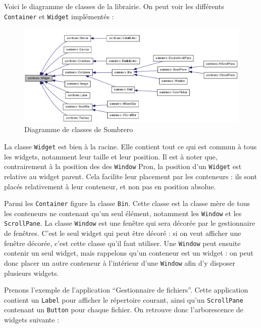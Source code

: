 Voici le diagramme de classes de la librairie. On peut voir les différents \verb|Container| et \verb|Widget| implémentés :

\begin{figure}[H]
  \centering
  \includegraphics[width=17.5cm]{images/classDiagWidget.png}
  \caption{Diagramme de classes de Sombrero}
  \label{fig:diagrame_classes_sombrero}
\end{figure}

La classe \verb|Widget| est bien à la racine.
Elle contient tout ce qui est commun à tous les widgets, notamment leur taille et leur position.
Il est à noter que, contrairement à la position des des \verb|Window| Pron, la position d'un \verb|Widget| est relative au widget parent.
Cela facilite leur placement par les conteneurs : ils sont placés relativement à leur conteneur, et non pas en position absolue.

Parmi les \verb|Container| figure la classe \verb|Bin|.
Cette classe est la classe mère de tous les conteneurs ne contenant qu'un seul élément, notamment les \verb|Window| et les \verb|ScrollPane|.
La classe \verb|Window| est une fenêtre qui sera décorée par le gestionnaire de fenêtres.
C'est le seul widget qui peut être décoré : si on veut afficher une fenêtre décorée, c'est cette classe qu'il faut utiliser.
Une \verb|Window| peut ensuite contenir un seul widget, mais rappelons qu'un conteneur est un widget : on peut donc placer un autre conteneur à l'intérieur d'une \verb|Window| afin d'y disposer plusieurs widgets.

Prenons l'exemple de l'application ``Gestionnaire de fichiers''.
Cette application contient un \verb|Label| pour afficher le répertoire courant, ainsi qu'un \verb|ScrollPane| contenant un \verb|Button| pour chaque fichier. On retrouve donc l'arborescence de widgets suivante :

\begin{center}
\end{center}

